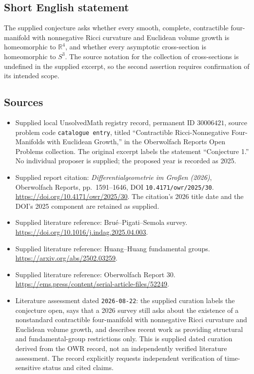 \documentclass[11pt]{article}
\newcommand{\R}{\mathbb{R}}
\begin{document}
\subsection{Short English statement}
The supplied conjecture asks whether every smooth, complete, contractible four-manifold with nonnegative Ricci curvature and Euclidean volume growth is homeomorphic to \(\R^4\), and whether every asymptotic cross-section is homeomorphic to \(S^3\). The source notation for the collection of cross-sections is undefined in the supplied excerpt, so the second assertion requires confirmation of its intended scope.
\subsection{Sources}
\begin{itemize}
\item Supplied local UnsolvedMath registry record, permanent ID \(30006421\), source problem code \texttt{catalogue entry}, titled ``Contractible Ricci-Nonnegative Four-Manifolds with Euclidean Growth,'' in the Oberwolfach Reports Open Problems collection. The original excerpt labels the statement ``Conjecture 1.'' No individual proposer is supplied; the proposed year is recorded as 2025.
\item Supplied report citation: \emph{Differentialgeometrie im Großen (2026)}, Oberwolfach Reports, pp.\ 1591--1646, DOI \texttt{10.4171/owr/2025/30}. \url{https://doi.org/10.4171/owr/2025/30}. The citation's 2026 title date and the DOI's 2025 component are retained as supplied.
\item Supplied literature reference: Brué--Pigati--Semola survey. \url{https://doi.org/10.1016/j.indag.2025.04.003}.
\item Supplied literature reference: Huang--Huang fundamental groups. \url{https://arxiv.org/abs/2502.03259}.
\item Supplied literature reference: Oberwolfach Report 30. \url{https://ems.press/content/serial-article-files/52249}.
\item Literature assessment dated \texttt{2026-08-22}: the supplied curation labels the conjecture open, says that a 2026 survey still asks about the existence of a nonstandard contractible four-manifold with nonnegative Ricci curvature and Euclidean volume growth, and describes recent work as providing structural and fundamental-group restrictions only. This is supplied dated curation derived from the OWR record, not an independently verified literature assessment. The record explicitly requests independent verification of time-sensitive status and cited claims.
\end{itemize}
\end{document}
